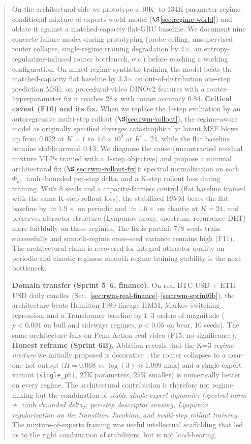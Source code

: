 \documentclass[11pt,a4paper]{article}
\begin{document}
\begin{abstract}
On the architectural side we prototype a 30K- to 134K-parameter
regime-conditional mixture-of-experts world model
($\S$\ref{sec:regime-world}) and ablate it against a matched-capacity
flat-GRU baseline. We document nine concrete failure modes during
prototyping (probe-ceiling, unsupervised router collapse,
single-regime training degradation by 4$\times$, an
entropy-regularizer-induced router bottleneck, etc.) before reaching
a working configuration. On mixed-regime synthetic training the
model beats the matched-capacity flat baseline by 3.3$\times$ on
out-of-distribution one-step prediction MSE; on procedural-video
DINOv2 features with a router-hyperparameter fix it reaches
28$\times$ with router accuracy 0.84.
\textbf{Critical caveat (F10) and its fix.} When we replace the 1-step
evaluation by an autoregressive multi-step rollout
($\S$\ref{sec:rwm-rollout}), the regime-aware model as originally
specified diverges catastrophically: latent MSE blows up from
$0.022$ at $K{=}1$ to $4.6{\times}10^9$ at $K{=}24$, while the flat
baseline remains stable around $0.13$. We diagnose the cause
(uncontracted residual mixture MLPs trained with a 1-step objective)
and propose a minimal architectural fix ($\S$\ref{sec:rwm-rollout-fix}):
spectral normalization on each $\Phi_k$, $\tanh$-bounded per-step
delta, and a K-step rollout loss during training. With 8 seeds and a
capacity-fairness control (flat baseline trained with the same K-step
rollout loss), the stabilized RWM beats the flat baseline by
$\approx 1.9\times$ on periodic and $\approx 1.6\times$ on chaotic at
$K{=}24$, and preserves attractor structure (Lyapunov-proxy, spectrum,
recurrence DET) more faithfully on those regimes. The fix is partial:
$7/8$ seeds train successfully and smooth-regime cross-seed variance
remains high (F11). The architectural claim is recovered for integral
attractor quality on periodic and chaotic regimes; smooth-regime
training stability is the next bottleneck.

\textbf{Domain transfer (Sprint 5--6, finance).} On real BTC-USD +
ETH-USD daily candles (Sec.~\ref{sec:rwm-real-finance}--\ref{sec:rwm-sprint6b}),
the architecture beats Hamilton-1989-lineage HMM, Markov-switching
regression, and a Transformer baseline by 1--3 orders of magnitude
($p{<}0.001$ on bull and sideways regimes, $p{<}0.05$ on bear, 10
seeds). The same architecture fails on Penn Action real video (F15,
no significance).
\textbf{Honest reframe (Sprint 6B).} Ablation reveals that the K=3
\emph{regime mixture} we initially proposed is decorative : the
router collapses to a near-one-hot output ($H{=}0.068$ vs $\log(3)
{\approx}1.099$ max) and a single-expert variant
(\texttt{single\_phi}, 22K parameters, $25\%$ smaller) is numerically
better on every regime. The architectural contribution is therefore
not regime mixing but the combination of \emph{stable single-expert
dynamics (spectral-norm + $\tanh$-bounded delta), per-step descriptor
sensing, Lyapunov regularization on the transition Jacobian, and
multi-step rollout training}. The mixture-of-experts framing was
useful intellectual scaffolding that led us to the right combination
of stabilizers, but is not load-bearing.


\end{abstract}
\end{document}
